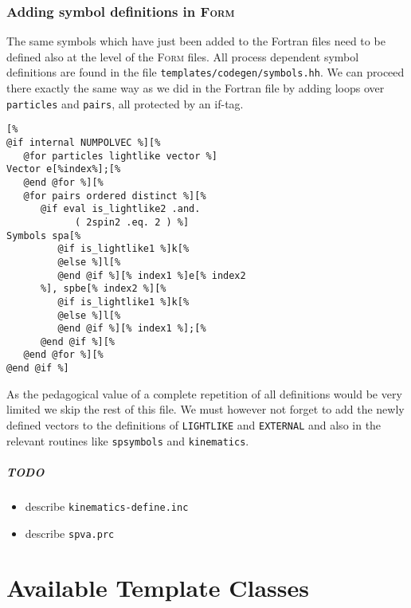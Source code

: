 \documentclass[11pt,a4paper]{refrep}
\newcommand{\form}{\textsc{Form}\xspace}
\begin{document}
\subsection{Adding symbol definitions in \form}
The same symbols which have just been added to the Fortran files
need to be defined also at the level of the \form{} files.
All process dependent symbol definitions are found in the file
\texttt{templates/\hspace{0pt}codegen/\hspace{0pt}symbols.hh}.
We can proceed there exactly the same way as we did in the Fortran file
by adding loops over \texttt{particles} and \texttt{pairs}, all protected
by an if-tag.
\begin{lstlisting}
[%
@if internal NUMPOLVEC %][%
   @for particles lightlike vector %]
Vector e[%index%];[%
   @end @for %][%
   @for pairs ordered distinct %][%
      @if eval is_lightlike2 .and.
            ( 2spin2 .eq. 2 ) %]
Symbols spa[%
         @if is_lightlike1 %]k[%
         @else %]l[%
         @end @if %][% index1 %]e[% index2
      %], spbe[% index2 %][%
         @if is_lightlike1 %]k[%
         @else %]l[%
         @end @if %][% index1 %];[%
      @end @if %][%
   @end @for %][%
@end @if %]
\end{lstlisting}
As the pedagogical value of a complete repetition of all definitions would
be very limited we skip the rest of this file. We must however not forget
to add the newly defined vectors to the definitions of \texttt{LIGHTLIKE}
and \texttt{EXTERNAL} and also in the relevant routines like
\texttt{spsymbols} and \texttt{kinematics}.

\paragraph{TODO}
\begin{itemize}
\item describe \texttt{kinematics-define.inc}
\item describe \texttt{spva.prc}
\end{itemize}

\appendix
{}
\chapter{Available Template Classes}
\label{appendix:template-classes}
\end{document}
